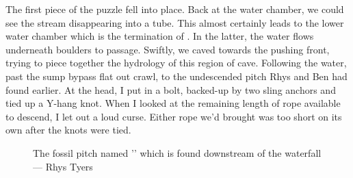     The first piece of the puzzle fell into place. Back at the water chamber, we could see the stream disappearing into a tube. This almost certainly leads to the lower water chamber which is the termination of . In the latter, the water flows underneath boulders to  passage. Swiftly, we caved towards the pushing front, trying to piece together the hydrology of this region of cave. Following the water, past the sump bypass flat out crawl, to the undescended pitch Rhys and Ben had found earlier. At the head, I put in a bolt, backed-up by two sling anchors and tied up a Y-hang knot. When I looked at the remaining length of rope available to descend, I let out a loud curse. Either rope we'd brought was too short on its own after the knots were tied. 

    \begin{figure}[h]
        \checkoddpage \ifoddpage \forcerectofloat \else \forceversofloat \fi
        \centering
        
        \caption{The fossil pitch named '\protect{}' which is found downstream of the \protect{} waterfall --- Rhys Tyers}
        \label{water chamber below helm's deep}
    \end{figure}

